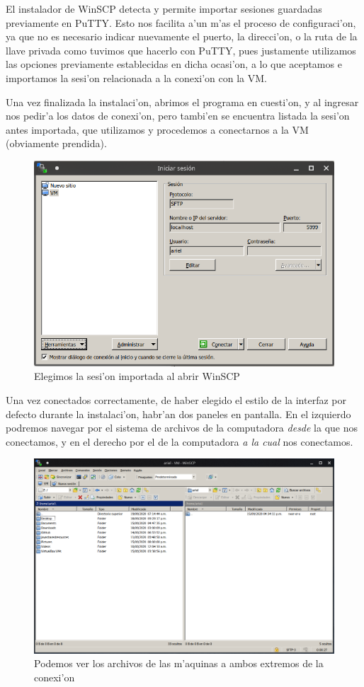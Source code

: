 \documentclass[11pt]{article}
\begin{document}
	El instalador de WinSCP detecta y permite importar sesiones guardadas previamente en PuTTY. Esto nos facilita a'un m'as el proceso de configuraci'on, ya que no es necesario indicar nuevamente el puerto, la direcci'on, o la ruta de la llave privada como tuvimos que hacerlo con PuTTY, pues justamente utilizamos las opciones previamente establecidas en dicha ocasi'on, a lo que aceptamos e importamos la sesi'on relacionada a la conexi'on con la VM.
	
	Una vez finalizada la instalaci'on, abrimos el programa en cuesti'on, y al ingresar nos pedir'a los datos de conexi'on, pero tambi'en se encuentra listada la sesi'on antes importada, que utilizamos y procedemos a conectarnos a la VM (obviamente prendida).
	
	\begin{figure}[H]
		\centering \captionsetup{justification=centering}
		\includegraphics[width=.8\linewidth]{Images/WinSCP/fig2}
		\caption{Elegimos la sesi'on importada al abrir WinSCP}
	\end{figure}

	Una vez conectados correctamente, de haber elegido el estilo de la interfaz por defecto durante la instalaci'on, habr'an dos paneles en pantalla. En el izquierdo podremos navegar por el sistema de archivos de la computadora \emph{desde} la que nos conectamos, y en el derecho por el de la computadora \emph{a la cual} nos conectamos.
	
	\begin{figure}[H]
		\centering \captionsetup{justification=centering}
		\includegraphics[width=.8\linewidth]{Images/WinSCP/fig3}
		\caption{Podemos ver los archivos de las m'aquinas a ambos extremos de la conexi'on}
	\end{figure}
\end{document}
